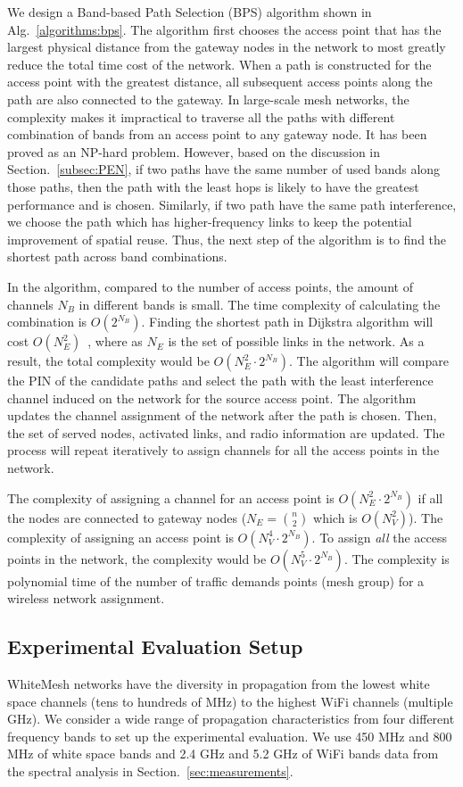 We design a Band-based Path Selection (BPS) algorithm shown in Alg.~\ref{algorithms:bps}. 
The algorithm first chooses the access point that has the largest physical distance from the 
gateway nodes in the network to most greatly reduce the total time cost of the network. 
When a path is constructed for the access point with the greatest distance, all 
subsequent access points along the path are also connected to the gateway. 
In large-scale mesh networks, the complexity makes it impractical to traverse all the 
paths with different combination of bands from an access point to any gateway node. It has been 
proved as an NP-hard problem. However, based on the discussion in Section.~\ref{subsec:PEN}, 
if two paths have the same number of used bands along those paths, then the path with the 
least hops is likely to have the greatest performance and is chosen. Similarly, if two path 
have the same path interference, we choose the path which has higher-frequency links to keep 
the potential improvement of spatial reuse. Thus, the next step of the algorithm is to find 
the shortest path across band combinations.

In the algorithm, compared to the number of access points, the amount of channels $N_B$ in
different bands is small. The time complexity of calculating the combination is $O(2^{N_B})$. 
Finding the shortest path in Dijkstra algorithm will cost $O(N_E^2)$~\cite{golden1976shortest}, 
where as $N_E$ is the set of possible links in the network. As a result, the total complexity 
would be $O(N_E^2\cdot 2^{N_B})$. 
The algorithm will compare the PIN of the candidate paths and select the path with the 
least interference channel induced on the network for the source access point.
The algorithm updates the channel assignment of the network after the path is chosen.
Then, the set of served nodes, activated links, and radio information are updated. 
The process will repeat iteratively to assign channels for all the access points in the
network.

The complexity of assigning a channel for an access point is $O(N_E^2\cdot2^{N_B})$ 
if all the nodes are connected to gateway nodes ($N_E={n \choose 2}$ which is $O(N_V^2)$). 
The complexity of assigning an access point is $O(N_V^4\cdot2^{N_B})$.
To assign {\it all} the access points in the network, the complexity would be 
$O(N_V^5\cdot2^{N_B})$. The complexity is polynomial time of the number of traffic 
demands points (mesh group) for a wireless network assignment.


\subsection{Experimental Evaluation Setup}
\label{subsec:design}
WhiteMesh networks have the diversity in propagation from the lowest white space channels 
(tens to hundreds of MHz) to the highest WiFi channels (multiple GHz). We consider a wide range 
of propagation characteristics from four different frequency bands to set up the experimental 
evaluation. We use 450 MHz and 800 MHz of white space bands and 2.4 GHz and 5.2 GHz of WiFi bands
data from the spectral analysis in Section.~\ref{sec:measurements}.

